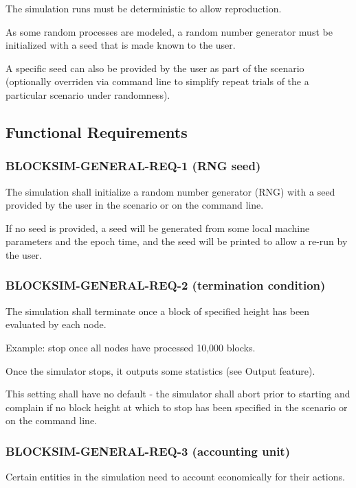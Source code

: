 \documentclass{scrreprt}
\begin{document}
The simulation runs must be deterministic to allow reproduction.

As some random processes are modeled, a random number generator must be
initialized with a seed that is made known to the user.

A specific seed can also be provided by the user as part of the scenario
(optionally overriden via command line to simplify repeat trials of the
a particular scenario under randomness).


\subsection{Functional Requirements}


\subsubsection{BLOCKSIM-GENERAL-REQ-1 (RNG seed)}

The simulation shall initialize a random number generator (RNG) with a seed
provided by the user in the scenario or on the command line.

If no seed is provided, a seed will be generated from some local machine
parameters and the epoch time, and the seed will be printed to allow
a re-run by the user.

\subsubsection{BLOCKSIM-GENERAL-REQ-2 (termination condition)}

The simulation shall terminate once a block of specified height has been
evaluated by each node.

Example: stop once all nodes have processed 10,000 blocks.

Once the simulator stops, it outputs some statistics (see Output feature).

This setting shall have no default - the simulator shall abort prior
to starting and complain if no block height at which to stop has been
specified in the scenario or on the command line.

\subsubsection{BLOCKSIM-GENERAL-REQ-3 (accounting unit)}

Certain entities in the simulation need to account economically for
their actions.
\end{document}
